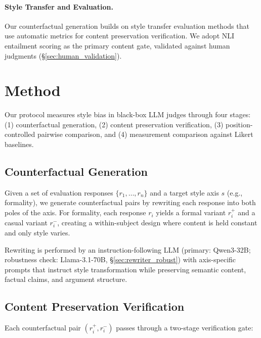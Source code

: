 \documentclass[11pt,a4paper]{article}
\begin{document}
\paragraph{Style Transfer and Evaluation.}
Our counterfactual generation builds on style transfer evaluation methods \cite{mir2019,krishna2020} that use automatic metrics for content preservation verification.
We adopt NLI entailment scoring as the primary content gate, validated against human judgments (\S\ref{sec:human_validation}).

\section{Method}
\label{sec:method}

Our protocol measures style bias in black-box LLM judges through four stages: (1) counterfactual generation, (2) content preservation verification, (3) position-controlled pairwise comparison, and (4) measurement comparison against Likert baselines.

\subsection{Counterfactual Generation}
\label{sec:counterfactual_gen}

Given a set of evaluation responses $\{r_1, \ldots, r_n\}$ and a target style axis $s$ (e.g., formality), we generate counterfactual pairs by rewriting each response into both poles of the axis.
For formality, each response $r_i$ yields a formal variant $r_i^{+}$ and a casual variant $r_i^{-}$, creating a within-subject design where content is held constant and only style varies.

Rewriting is performed by an instruction-following LLM (primary: Qwen3-32B; robustness check: Llama-3.1-70B, \S\ref{sec:rewriter_robust}) with axis-specific prompts that instruct style transformation while preserving semantic content, factual claims, and argument structure.

\subsection{Content Preservation Verification}
\label{sec:content_verify}

Each counterfactual pair $(r_i^{+}, r_i^{-})$ passes through a two-stage verification gate:
\end{document}
